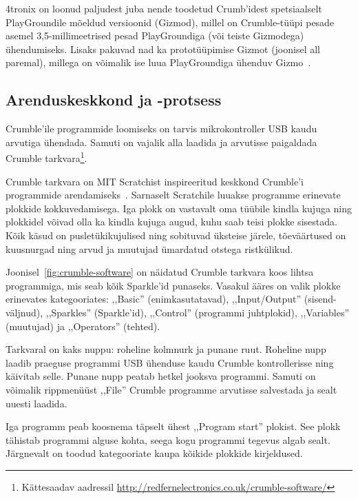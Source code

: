 \documentclass[12pt]{article}
\begin{document}
4tronix on loonud paljudest juba nende toodetud Crumb’idest spetsiaalselt PlayGroundile mõeldud versioonid (Gizmod), millel on Crumble-tüüpi pesade asemel 3,5-millimeetrised pesad PlayGroundiga (või teiste Gizmodega) ühendumiseks. Lisaks pakuvad nad ka prototüüpimise Gizmot (joonisel all paremal), millega on võimalik ise luua PlayGroundiga ühenduv Gizmo~\cite{PrototypingGizmoforPlayground-MakeyourownGizmo}.


\subsection{Arenduskeskkond ja -protsess} \label{tarkvara}

Crumble’ile programmide loomiseks on tarvis mikrokontroller USB kaudu arvutiga ühendada. Samuti on vajalik alla laadida ja arvutisse paigaldada Crumble tarkvara\footnote{Kättesaadav aadressil \url{http://redfernelectronics.co.uk/crumble-software/}}.

Crumble tarkvara on MIT Scratchist inspireeritud keskkond Crumble’i programmide arendamiseks~\cite{TheCrumbleController}. Sarnaselt Scratchile luuakse programme erinevate plokkide kokkuvedamisega. Iga plokk on vastavalt oma tüübile kindla kujuga ning plokkidel võivad olla ka kindla kujuga augud, kuhu saab teisi plokke sisestada. Kõik käsud on pusletükikujulised ning sobituvad üksteise järele, tõeväärtused on kuusnurgad ning arvud ja muutujad ümardatud otstega ristkülikud.


Joonisel~\ref{fig:crumble-software} on näidatud Crumble tarkvara koos lihtsa programmiga, mis seab kõik Sparkle’id punaseks. Vasakul ääres on valik plokke erinevates kategooriates: ,,Basic'' (enimkasutatavad), ,,Input/Output'' (sisend-väljnud), ,,Sparkles'' (Sparkle’id), ,,Control'' (programmi juhtplokid), ,,Variables'' (muutujad) ja ,,Operators'' (tehted).

Tarkvaral on kaks nuppu: roheline kolmnurk ja punane ruut. Roheline nupp laadib praeguse programmi USB ühenduse kaudu Crumble kontrollerisse ning käivitab selle. Punane nupp peatab hetkel jooksva programmi. Samuti on võimalik rippmenüüst ,,File'' Crumble programme arvutisse salvestada ja sealt uuesti laadida.

Iga programm peab koosnema täpselt ühest ,,Program start'' plokist. See plokk tähistab programmi alguse kohta, seega kogu programmi tegevus algab sealt. Järgnevalt on toodud kategooriate kaupa kõikide plokkide kirjeldused.
\end{document}
